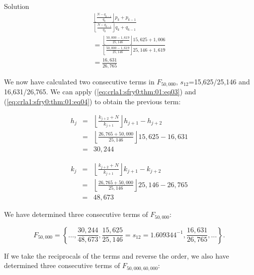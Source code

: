 \begin{vworkexampleparsection}{Solution}
\begin{eqnarray}
\nonumber{}& \displaystyle{\frac{{\displaystyle{\left\lfloor {\frac{{N - q_{k - 1} }}{{q_k }}} \right\rfloor}
 p_k  + p_{k - 1} }}{{\displaystyle{\left\lfloor {\frac{{N - q_{k - 1} }}{{q_k }}}
 \right\rfloor} q_k  + q_{k - 1} }}}
& \\
& =
\displaystyle{\frac{{\displaystyle{\left\lfloor {\frac{{50,\!000 - 1,\!619 }}{{25,\!146}}} \right\rfloor}
 15,\!625  + 1,\!006 }}{{\displaystyle{\left\lfloor {\frac{{50,\!000 - 1,\!619 }}{{25,\!146}}}
 \right\rfloor} 25,\!146  + 1,\!619 }}} & \\
\nonumber{}& =
\displaystyle{\frac{\displaystyle{16,\!631}}{\displaystyle{26,\!765}}} &
\end{eqnarray}

We now have calculated two consecutive terms in $F_{50,\!000}$, $s_{12}$=15,625/25,146 and 16,631/26,765\@.
We can apply (\ref{eq:crla1:sfry0:thm:01:eq03}) and (\ref{eq:crla1:sfry0:thm:01:eq04}) to obtain
the previous term:

\begin{eqnarray}
\nonumber{}h_j  & = & \left\lfloor {\frac{{k_{j + 2}  + N}}{{k_{j + 1} }}}\right\rfloor h_{j + 1}  - h_{j + 2} \\
                & = & \left\lfloor {\frac{{26,\!765  + 50,\!000}}{{25,\!146 }}}\right\rfloor 15,\!625  - 16,\!631 \\
\nonumber{}     & = & 30,\!244
\end{eqnarray}

\begin{eqnarray}
\nonumber{}k_j  & = & \left\lfloor {\frac{{k_{j + 2}  + N}}{{k_{j + 1} }}}\right\rfloor k_{j + 1}  - k_{j + 2} \\
                & = & \left\lfloor {\frac{{26,\!765  + 50,\!000}}{{25,\!146 }}}\right\rfloor 25,\!146  - 26,\!765 \\
\nonumber{}     & = & 48,\!673
\end{eqnarray}

We have determined three consecutive terms of $F_{50,\!000}$:

\begin{equation}
F_{50,\!000} = \left\{ \ldots, \frac{30,\!244}{48,\!673},
\frac{15,\!625}{25,\!146} = s_{12} = 1.609344^{-1},
\frac{16,\!631}{26,\!765}, \ldots \right\}.
\end{equation}

If we take the reciprocals of the terms and reverse the order, we also have determined
three consecutive terms of $F_{50,\!000,60,\!000}$:


\end{vworkexampleparsection}
